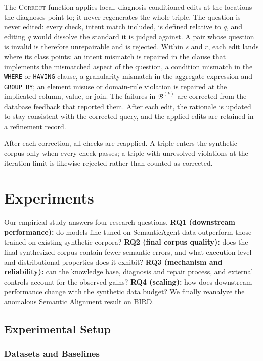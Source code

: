 \documentclass[letterpaper,journal]{IEEEtran}
\begin{document}
The \textsc{Correct} function applies local, diagnosis-conditioned edits at the locations the diagnoses point to; it never regenerates the whole triple. The question is never edited: every check, intent match included, is defined relative to $q$, and editing $q$ would dissolve the standard it is judged against. A pair whose question is invalid is therefore unrepairable and is rejected. Within $s$ and $r$, each edit lands where its class points: an intent mismatch is repaired in the clause that implements the mismatched aspect of the question, a condition mismatch in the \texttt{WHERE} or \texttt{HAVING} clause, a granularity mismatch in the aggregate expression and \texttt{GROUP BY}; an element misuse or domain-rule violation is repaired at the implicated column, value, or join. The failures in $\mathcal{B}^{(k)}$ are corrected from the database feedback that reported them. After each edit, the rationale is updated to stay consistent with the corrected query, and the applied edits are retained in a refinement record.

After each correction, all checks are reapplied. A triple enters the synthetic corpus only when every check passes; a triple with unresolved violations at the iteration limit is likewise rejected rather than counted as corrected.

\section{Experiments}
\label{sec:experiments}

Our empirical study answers four research questions. \textbf{RQ1 (downstream performance):} do models fine-tuned on SemanticAgent data outperform those trained on existing synthetic corpora? \textbf{RQ2 (final corpus quality):} does the final synthesized corpus contain fewer semantic errors, and what execution-level and distributional properties does it exhibit? \textbf{RQ3 (mechanism and reliability):} can the knowledge base, diagnosis and repair process, and external controls account for the observed gains? \textbf{RQ4 (scaling):} how does downstream performance change with the synthetic data budget? We finally reanalyze the anomalous Semantic Alignment result on BIRD.

\subsection{Experimental Setup}

\subsubsection{Datasets and Baselines}
\end{document}
